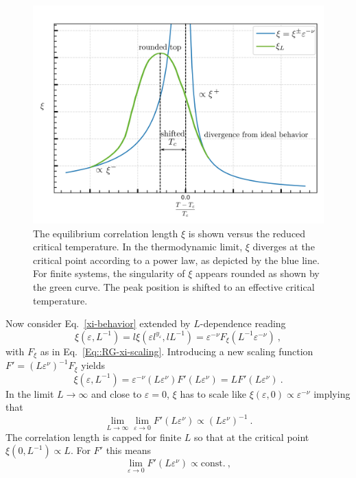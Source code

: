	\begin{figure}[htp]
		\centering
		\includegraphics[width=0.7\linewidth]{graphics/xi-divergence5.png}
		\caption{The equilibrium correlation length $\xi$ is shown versus the reduced critical temperature. In the thermodynamic limit, $\xi$ diverges at the critical point according to a power law, as depicted by the blue line. For finite systems, the singularity of $\xi$ appears rounded as shown by the green curve. The peak position is shifted to an effective critical temperature.}
		\label{xi-divergence-FS}
	\end{figure}
	Now consider Eq.~\eqref{xi-behavior} extended by $L$-dependence reading
	\begin{equation}
		\xi(\varepsilon, L^{-1}) =	l \xi (\varepsilon l^{y_\varepsilon}, l L^{-1}) = \varepsilon^{-\nu} F_\xi (L^{-1} \varepsilon^{-\nu})~,
	\end{equation}
	with $F_\xi$ as in Eq.~\eqref{Eq::RG-xi-scaling}. Introducing a new scaling function $F' =	(L \varepsilon^\nu)^{-1} F_\xi$ yields
	\begin{equation}
		\xi(\varepsilon, L^{-1}) = \varepsilon^{-\nu} (L\varepsilon^\nu) F' (L \varepsilon^{\nu}) =	L	F'(L \varepsilon^\nu)~.
	\end{equation}
	In the limit $L \rightarrow \infty$ and close to $\varepsilon =	0$, $\xi$ has to scale like $\xi(\varepsilon, 0) \propto \varepsilon^{-\nu}$ implying that
	\begin{equation}
		\lim_{L \rightarrow \infty} \lim_{\varepsilon \rightarrow 0} F'(L \varepsilon^\nu) \propto (L \varepsilon^\nu)^{-1}~.
	\end{equation}
	The correlation length is capped for finite $L$ so that at the critical point $\xi(0, L^{-1}) \propto L$. For $F'$ this means
	\begin{equation}
		\lim_{\varepsilon \rightarrow 0} F'(L\varepsilon^\nu) \propto \text{const.}~,
	\end{equation}
